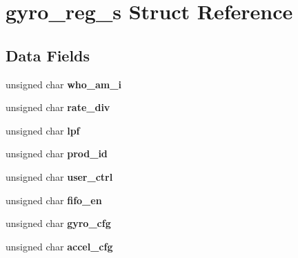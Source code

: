 \hypertarget{structgyro__reg__s}{}\section{gyro\+\_\+reg\+\_\+s Struct Reference}
\label{structgyro__reg__s}
\subsection*{Data Fields}
\begin{DoxyCompactItemize}
\item 
unsigned char {\bfseries who\+\_\+am\+\_\+i}\hypertarget{structgyro__reg__s_aa52d78bb2b62fee23a0b759e545dba4b}{}\label{structgyro__reg__s_aa52d78bb2b62fee23a0b759e545dba4b}

\item 
unsigned char {\bfseries rate\+\_\+div}\hypertarget{structgyro__reg__s_a401bb6ee7e48a2bf55398cbaf70c0dc3}{}\label{structgyro__reg__s_a401bb6ee7e48a2bf55398cbaf70c0dc3}

\item 
unsigned char {\bfseries lpf}\hypertarget{structgyro__reg__s_a0a4067140c6a3704b4312ba62b77aadb}{}\label{structgyro__reg__s_a0a4067140c6a3704b4312ba62b77aadb}

\item 
unsigned char {\bfseries prod\+\_\+id}\hypertarget{structgyro__reg__s_ae6ca290ca1a107f4cb7986047071d7d9}{}\label{structgyro__reg__s_ae6ca290ca1a107f4cb7986047071d7d9}

\item 
unsigned char {\bfseries user\+\_\+ctrl}\hypertarget{structgyro__reg__s_ad8384710853dc1f9580b9ff19e87efbc}{}\label{structgyro__reg__s_ad8384710853dc1f9580b9ff19e87efbc}

\item 
unsigned char {\bfseries fifo\+\_\+en}\hypertarget{structgyro__reg__s_a480d2fa5db4e9c42c61d886d09c5e448}{}\label{structgyro__reg__s_a480d2fa5db4e9c42c61d886d09c5e448}

\item 
unsigned char {\bfseries gyro\+\_\+cfg}\hypertarget{structgyro__reg__s_ac2b87a25876eb44862043cd56d33d49b}{}\label{structgyro__reg__s_ac2b87a25876eb44862043cd56d33d49b}

\item 
unsigned char {\bfseries accel\+\_\+cfg}\hypertarget{structgyro__reg__s_a3e39cea9e122765d4770876d4ce6adc7}{}\label{structgyro__reg__s_a3e39cea9e122765d4770876d4ce6adc7}


\end{DoxyCompactItemize}
